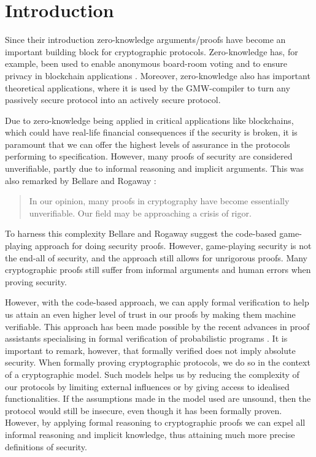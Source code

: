 \chapter{Introduction}
\label{ch:intro}
Since their introduction zero-knowledge arguments/proofs have become
an important building block for cryptographic protocols.
Zero-knowledge has, for example, been used to enable anonymous board-room
voting \cite{boardroom-voting} and to ensure privacy in blockchain applications \cite{concordium}.
Moreover, zero-knowledge also has important theoretical applications, where it
is used by the GMW-compiler to turn any passively secure protocol into an
actively secure protocol.

Due to zero-knowledge being applied in critical applications like
blockchains, which could have real-life financial consequences if the security is
broken, it is paramount that we can offer the highest levels of assurance in the
protocols performing to specification.
However, many proofs of security are considered unverifiable, partly due to informal
reasoning and implicit arguments. This was also remarked by Bellare and Rogaway \cite{game-playing}:

\begin{quote}
In our opinion, many proofs in cryptography have become essentially unverifiable. Our field may be approaching a crisis of rigor.
\end{quote}

To harness this complexity Bellare and Rogaway suggest the code-based game-playing approach
for doing security proofs.
However, game-playing security is not the end-all of security, and the approach
still allows for unrigorous proofs. Many cryptographic proofs still suffer
from informal arguments and human errors when proving security.

However, with the code-based approach, we can apply
formal verification to help us attain an even higher level of trust in our
proofs by making them machine verifiable.
This approach has been made possible by the recent advances in proof assistants
specialising in formal verification of probabilistic programs \cite{SOK:CAC}.
It is important to remark, however, that formally verified does not imply
absolute security. When formally proving cryptographic protocols, we do so in
the context of a cryptographic model.
Such models helps us by reducing the complexity of our protocols
by limiting external influences or by giving access to idealised
functionalities. If the assumptions made in the model used are unsound, then the
protocol would still be insecure, even though it has been formally proven.
However, by applying formal
reasoning to cryptographic proofs we can expel all informal reasoning and
implicit knowledge, thus attaining much more precise definitions of security.

